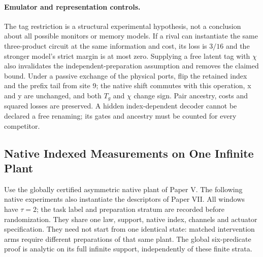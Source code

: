 \documentclass[11pt,a4paper]{article}
\theoremstyle{definition}
\begin{document}
\paragraph{Emulator and representation controls.}
The tag restriction is a structural experimental hypothesis, not a conclusion
about all possible monitors or memory models. If a rival can instantiate the
same three-product circuit at the same information and cost, its loss is
$3/16$ and the stronger model's strict margin is at most zero. Supplying a
free latent tag with $\chi$ also invalidates the independent-preparation
assumption and removes the claimed bound. Under a passive exchange of the
physical ports, flip the retained index and the prefix tail from site 9;
the native shift commutes with this operation, x and y are unchanged, and
both $T_g$ and $\chi$ change sign. Pair ancestry, costs and squared losses
are preserved. A hidden index-dependent decoder cannot be declared a free
renaming; its gates and ancestry must be counted for every competitor.

\subsection{Native Indexed Measurements on One Infinite Plant}

Use the globally certified asymmetric native plant of Paper V. The following
native experiments also instantiate the descriptors of Paper VII. All windows have $\tau=2$;
the task label and preparation stratum are recorded before randomization.
They share one law, support, native index, channels and actuator specification.
They need not start from one identical state: matched intervention arms require
different preparations of that same plant. The global six-predicate proof is
analytic on its full infinite support, independently of these finite strata.
\end{document}
